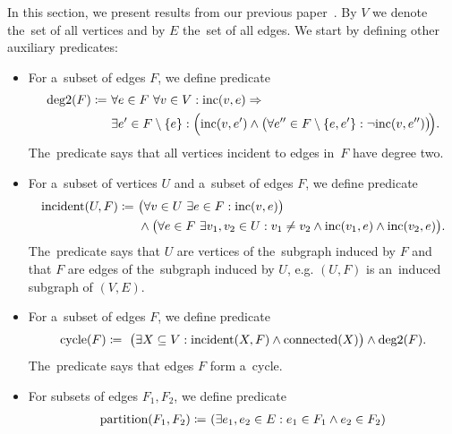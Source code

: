 In this section, we present results from our previous paper~\cite{my_paper}.
By \( V \) we denote the~set of all vertices and
by \( E \) the~set of all edges.
We start by defining other auxiliary predicates:
%
\begin{itemize}
	\item For a~subset of edges \( F \), we define predicate
	      \begin{align*}
		      \text{deg2}(F) \coloneqq \ 
		       & \forall e \in F \  \forall v \in V : \text{inc} (v, e) \Rightarrow                                                                      \\
		       & \exists e' \in F \setminus \{e\} : \Big( \text{inc} (v, e') \land \big(\forall e'' \in F \setminus \{e, e'\}: \lnot \text{inc} (v, e'')\big)\!\Big).
	      \end{align*}
	      The~predicate says that all vertices incident to edges in~\( F \) have degree two.
	\item For a~subset of vertices \( U \) and a~subset of edges \( F \), we define predicate
	      \begin{align*}
		      \text{incident}(U, F) \coloneqq \ 
		       & \big(\forall v \in U \  \exists e \in F : \text{inc} (v, e)\big)                                                       \\
		       & \land \big(\forall e \in F \  \exists v_1, v_2 \in U : v_1 \ne v_2 \land \text{inc} (v_1, e) \land \text{inc} (v_2, e)\big).
	      \end{align*}
	      The~predicate says that \( U \) are vertices of the~subgraph induced by \( F \)
	      and that \( F \) are edges of the~subgraph induced by \( U \),
	      e.g. \( (U, F) \) is an~induced subgraph of \( (V, E) \).
	\item For a~subset of edges \( F \), we define predicate
	      \begin{align*}
		      \text{cycle}(F) \coloneqq \ 
		      \big( \exists X \subseteq V : \text{incident}(X, F) \land \text{connected}(X) \big)
		      \land \text{deg2}(F).
	      \end{align*}
	      The~predicate says that edges \( F \) form a~cycle.
	\item For subsets of edges \( F_1, F_2 \), we define predicate
	      \begin{align*}
		      \text{partition}(F_1, F_2) \coloneqq \predsp
		       & (\exists e_1, e_2 \in E : e_1 \in F_1 \land e_2 \in F_2 )    \\

\end{align*}
\end{itemize}

